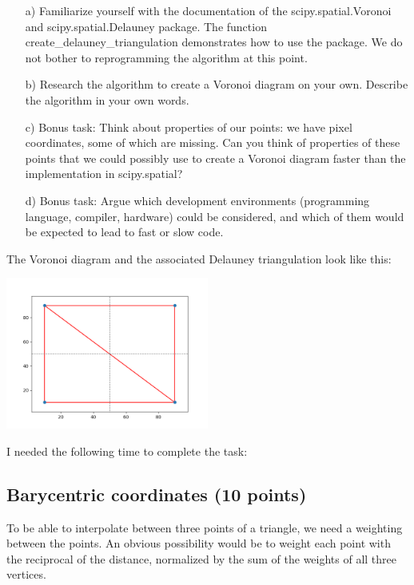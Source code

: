 \begin{enumerate}

\item[a)] Familiarize yourself with the documentation of the scipy.spatial.Voronoi and scipy.spatial.Delauney package. The function create\_delauney\_triangulation demonstrates how to use the package. We do not bother to reprogramming the algorithm at this point. 

\item[b)] Research the algorithm to create a Voronoi diagram on your own. Describe the algorithm in your own words.

\item[c)] Bonus task: Think about properties of our points: we have pixel coordinates, some of which are missing. Can you think of properties of these points that we could possibly use to create a Voronoi diagram faster than the implementation in scipy.spatial? 

\item[d)] Bonus task: Argue which development environments (programming language, compiler, hardware) could be considered, and which of them would be expected to lead to fast or slow code.

\end{enumerate}

The Voronoi diagram and the associated Delauney triangulation look like this:

\begin{center}
\includegraphics[width=0.5\textwidth]{source_code/example_delauney.png}
\end{center}

I needed the following time to complete the task:

\subsection{Barycentric coordinates (10 points)}

To be able to interpolate between three points of a triangle, we need a weighting between the points. An obvious possibility would be to weight each point with the reciprocal of the distance, normalized by the sum of the weights of all three vertices. 

